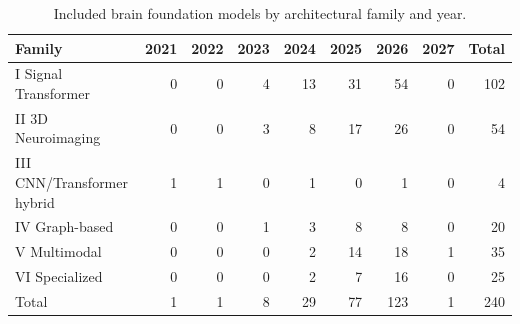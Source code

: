 \begin{table}[!t]\centering\footnotesize\caption{Included brain foundation models by architectural family and year.}\label{tab:family_year}\setlength{\tabcolsep}{4pt}
\begin{tabular}{@{}lrrrrrrrr@{}}\toprule \textbf{Family} & \textbf{2021} & \textbf{2022} & \textbf{2023} & \textbf{2024} & \textbf{2025} & \textbf{2026} & \textbf{2027} & \textbf{Total} \\ \midrule
I Signal Transformer & 0 & 0 & 4 & 13 & 31 & 54 & 0 & 102 \\
II 3D Neuroimaging & 0 & 0 & 3 & 8 & 17 & 26 & 0 & 54 \\
III CNN/Transformer hybrid & 1 & 1 & 0 & 1 & 0 & 1 & 0 & 4 \\
IV Graph-based & 0 & 0 & 1 & 3 & 8 & 8 & 0 & 20 \\
V Multimodal & 0 & 0 & 0 & 2 & 14 & 18 & 1 & 35 \\
VI Specialized & 0 & 0 & 0 & 2 & 7 & 16 & 0 & 25 \\
\midrule Total & 1 & 1 & 8 & 29 & 77 & 123 & 1 & 240 \\ \bottomrule\end{tabular}\end{table}